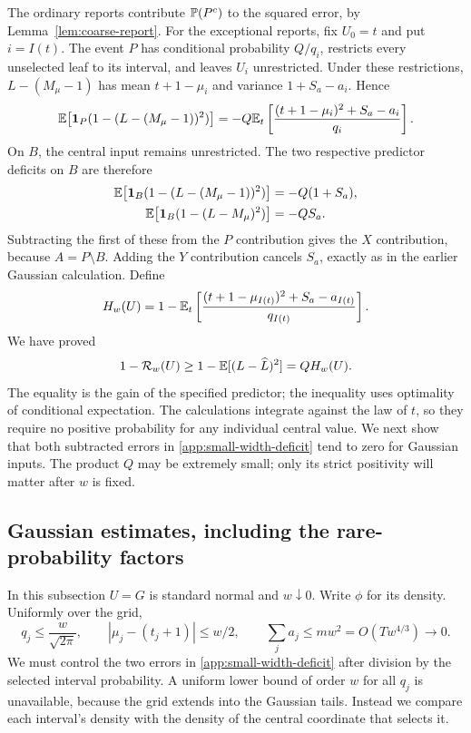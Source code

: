 The ordinary reports contribute $\mathbb P(P^c)$ to the squared error,
by Lemma~\ref{lem:coarse-report}. For the exceptional reports, fix
$U_0=t$ and put $i=I(t)$. The event $P$ has conditional probability
$Q/q_i$, restricts every unselected leaf to its interval, and leaves
$U_i$ unrestricted. Under these restrictions, $L-(M_\mu-1)$ has mean
$t+1-\mu_i$ and variance $1+S_a-a_i$. Hence
\[
 \mathbb E\bigl[\mathbf 1_P(1-(L-(M_\mu-1))^2)\bigr]
 =-Q\mathbb E_t\left[\frac{(t+1-\mu_i)^2+S_a-a_i}{q_i}\right].
\]
On $B$, the central input remains unrestricted. The two respective
predictor deficits on $B$ are therefore
\begin{align*}
 \mathbb E\bigl[\mathbf 1_B(1-(L-(M_\mu-1))^2)\bigr]&=-Q(1+S_a),\\
 \mathbb E\bigl[\mathbf 1_B(1-(L-M_\mu)^2)\bigr]&=-QS_a.
\end{align*}
Subtracting the first of these from the $P$ contribution gives the
$X$ contribution, because $A=P\setminus B$. Adding the $Y$
contribution cancels $S_a$, exactly as in the earlier Gaussian
calculation. Define
\begin{equation}\label{app:small-width-deficit}
 H_w(U)=1-\mathbb E_t\left[
       \frac{(t+1-\mu_{I(t)})^2+S_a-a_{I(t)}}{q_{I(t)}}\right].
\end{equation}
We have proved
\begin{equation}\label{app:small-width-residual}
 1-\mathcal R_w(U)\ge
 1-\mathbb E[(L-\widehat L)^2]=QH_w(U).
\end{equation}
The equality is the gain of the specified predictor; the inequality
uses optimality of conditional expectation. The calculations integrate
against the law of $t$, so they require no positive probability for
any individual central value. We next show that both subtracted
errors in \eqref{app:small-width-deficit} tend to zero for Gaussian
inputs. The product $Q$ may be extremely small; only its strict
positivity will matter after $w$ is fixed.

\subsection{Gaussian estimates, including the rare-probability factors}
\label{app:small-width-estimates}

In this subsection $U=G$ is standard normal and $w\downarrow0$.
Write $\phi$ for its density.  Uniformly over the grid,
\[
 q_j\le\frac{w}{\sqrt{2\pi}},\qquad
 |\mu_j-(t_j+1)|\le w/2,\qquad
 \sum_ja_j\le mw^2=O(Tw^{4/3})\longrightarrow0.
\]
We must control the two errors in \eqref{app:small-width-deficit}
after division by the selected interval probability. A uniform lower
bound of order $w$ for all $q_j$ is unavailable, because the grid
extends into the Gaussian tails. Instead we compare each interval's
density with the density of the central coordinate that selects it.

